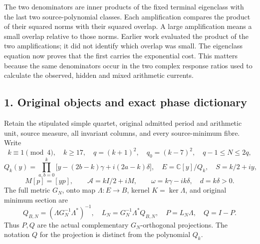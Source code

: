 \documentclass[10pt]{article}
\begin{document}
The two denominators are inner products of the fixed terminal eigenclass with the last two source-polynomial classes. Each amplification compares the product of their squared norms with their squared overlap. A large amplification means a small overlap relative to those norms. Earlier work evaluated the product of the two amplifications; it did not identify which overlap was small. The eigenclass equation now proves that the first carries the exponential cost. This matters because the same denominators occur in the two complex response ratios used to calculate the observed, hidden and mixed arithmetic currents.

\subsection{1. Original objects and exact phase dictionary}\label{original-objects-and-exact-phase-dictionary}

Retain the stipulated simple quartet, original admitted period and arithmetic unit, source measure, all invariant columns, and every source-minimum fibre. Write \[
k\equiv1\pmod4,\quad k\ge17,\quad q=(k+1)^2,\quad q_0=(k-7)^2,
\quad q-1\le N\le2q,
\] \[
Q_k(y)=\prod_{a,b=0}^k\bigl[y-(2b-k)\gamma+i(2a-k)\delta\bigr],
\quad E=\mathbb C[y]/Q_k,\quad S=k/2+iy,
\] \[
M[p]=[yp],\qquad \mathscr A=kI/2+iM,\qquad
\omega=k\gamma-ik\delta,\quad d=k\delta>0.
\tag{RD1}
\] The full metric \(G_N\), onto map \(\Lambda:E\to B\), kernel \(K=\ker\Lambda\), and original minimum section are \[
Q_{B,N}=(\Lambda G_N^{-1}\Lambda^*)^{-1},\quad
L_N=G_N^{-1}\Lambda^*Q_{B,N},\quad
P=L_N\Lambda,\quad Q=I-P.
\tag{RD2}
\] Thus \(P,Q\) are the actual complementary \(G_N\)-orthogonal projections. The notation \(Q\) for the projection is distinct from the polynomial \(Q_k\).
\end{document}
